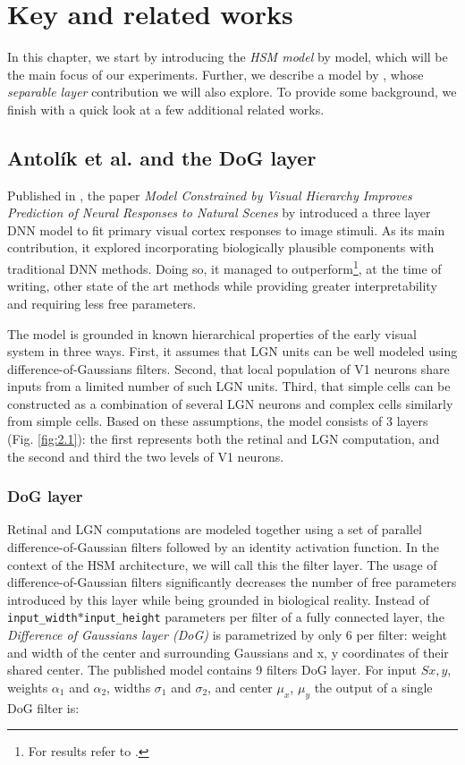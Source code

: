 \chapter{Key and related works}\label{ch:2}

In this chapter, we start by introducing the \textit{HSM model} by \cite{antolik} model, which will be the main focus of our experiments. Further, we describe a model by \cite{klindt}, whose \textit{separable layer} contribution we will also explore. To provide some background, we finish with a quick look at a few additional related works.

\section{Antolík et al. and the DoG layer}

Published in \citeyear{antolik}, the paper \textit{Model Constrained by Visual Hierarchy Improves Prediction of Neural Responses to Natural Scenes} by \citeauthor{antolik} introduced a three layer DNN model to fit primary visual cortex responses to image stimuli. As its main contribution, it explored incorporating biologically plausible components with traditional DNN methods. Doing so, it managed to outperform\footnote{For results refer to .}, at the time of writing, other state of the art methods while providing greater interpretability and requiring less free parameters.

The model is grounded in known hierarchical properties of the early visual system in three ways. First, it assumes that LGN units can be well modeled using difference-of-Gaussians filters. Second, that local population of V1 neurons share inputs from a limited number of such LGN units. Third, that simple cells can be constructed as a combination of several LGN neurons and complex cells similarly from simple cells. Based on these assumptions, the model consists of 3 layers (Fig. \ref{fig:2.1}): the first represents both the retinal and LGN computation, and the second and third the two levels of V1 neurons.

\subsection{DoG layer}\label{ch:2.1.1}

Retinal and LGN computations are modeled together using a set of parallel difference-of-Gaussian filters followed by an identity activation function. In the context of the HSM architecture, we will call this the filter layer. The usage of difference-of-Gaussian filters significantly decreases the number of free parameters introduced by this layer while being grounded in biological reality. Instead of \texttt{input\_width}$*$\texttt{input\_height} parameters per filter of a fully connected layer, the \textit{Difference of Gaussians layer (DoG)} is parametrized by only 6 per filter: weight and width of the center and surrounding Gaussians and x, y coordinates of their shared center. The published model contains 9 filters DoG layer. For input $S{x,y}$, weights $\alpha_1$ and $\alpha_2$, widths $\sigma_1$ and $\sigma_2$, and center $\mu_x$, $\mu_y$ the output of a single DoG filter is:

